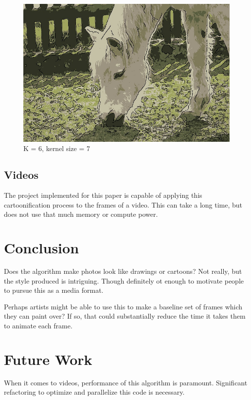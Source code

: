 \documentclass[11pt]{article}
\begin{document}
\begin{figure}
  \includegraphics[width=\linewidth]{figures/white_horse_K=6_ksize=7.jpg}
  \caption{K = 6, kernel size = 7}
\end{figure}

\subsection{Videos}

The project implemented for this paper is capable of applying this cartoonification process to the frames of a video.
This can take a long time, but does not use that much memory or compute power.

\section{Conclusion}

Does the algorithm make photos look like drawings or cartoons?
Not really, but the style produced is intriguing.
Though definitely ot enough to motivate people to pursue this as a media format.

Perhaps artists might be able to use this to make a baseline set of frames which they can paint over?
If so, that could substantially reduce the time it takes them to animate each frame.

\section {Future Work}

When it comes to videos, performance of this algorithm is paramount.
Significant refactoring to optimize and parallelize this code is necessary.
\end{document}
